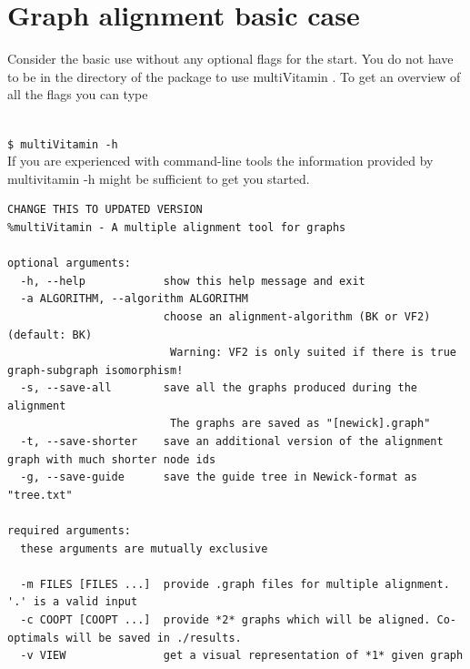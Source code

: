 \documentclass{SeminarV2}
\newcommand{\shellcmd}[1]{\\\indent\indent\texttt{\footnotesize\$ #1}\\}
\newcommand{\mV}{multiVitamin }
\begin{document}
\section{Graph alignment basic case}
Consider the basic use without any optional flags for the start. You do not have to be in the directory of the package to use \mV. To get an overview of all the flags you can type 

\shellcmd{multiVitamin -h}

If you are experienced with command-line tools the information provided by multivitamin -h might be sufficient to get you started.\\

\begin{lstlisting}
CHANGE THIS TO UPDATED VERSION
%multiVitamin - A multiple alignment tool for graphs

optional arguments:
  -h, --help            show this help message and exit
  -a ALGORITHM, --algorithm ALGORITHM
                        choose an alignment-algorithm (BK or VF2) (default: BK)
                         Warning: VF2 is only suited if there is true graph-subgraph isomorphism!
  -s, --save-all        save all the graphs produced during the alignment
                         The graphs are saved as "[newick].graph"
  -t, --save-shorter    save an additional version of the alignment graph with much shorter node ids
  -g, --save-guide      save the guide tree in Newick-format as "tree.txt"

required arguments:
  these arguments are mutually exclusive

  -m FILES [FILES ...]  provide .graph files for multiple alignment. '.' is a valid input
  -c COOPT [COOPT ...]  provide *2* graphs which will be aligned. Co-optimals will be saved in ./results.
  -v VIEW               get a visual representation of *1* given graph
\end{lstlisting}
\end{document}
